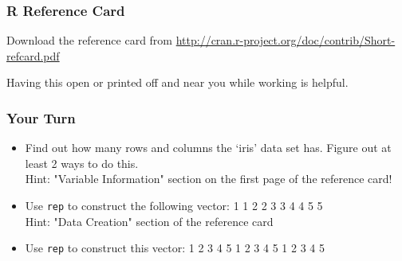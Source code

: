 \documentclass{beamer}\usepackage[]{graphicx}\usepackage[]{color}
\begin{document}
\begin{frame}
    \frametitle{R Reference Card}
Download the reference card from \url{http://cran.r-project.org/doc/contrib/Short-refcard.pdf}

Having this open or printed off and near you while working is helpful.
\end{frame}

\begin{frame}[fragile]
    \frametitle{Your Turn}
    \begin{itemize}

        \item Find out how many rows and columns the `iris' data set has.  Figure out at least 2 ways to do this.\\ 
        Hint: "Variable Information" section on the first page of the reference card!
        \item Use \texttt{rep} to construct the following vector:  1 1 2 2 3 3 4 4 5 5 \\
        Hint: "Data Creation" section of the reference card
        \item Use \texttt{rep} to construct this vector: 1 2 3 4 5 1 2 3 4 5 1 2 3 4 5
    \end{itemize}
\end{frame}
\end{document}
